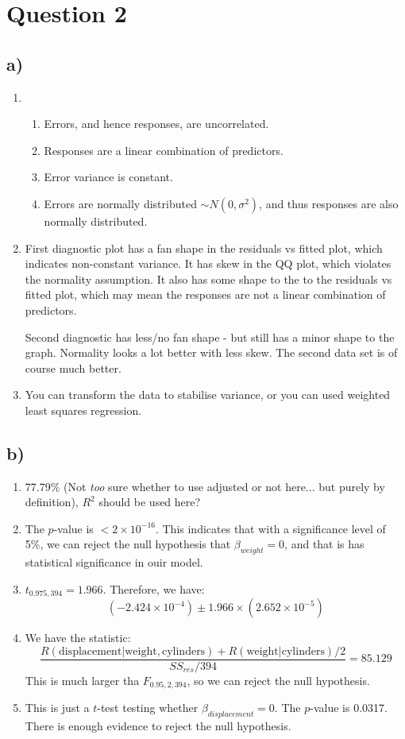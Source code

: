 \documentclass{article}
\begin{document}
\newpage 
\section*{Question 2}
\subsection*{a)}
\begin{enumerate}
    \item \begin{enumerate}
        \item Errors, and hence responses, are uncorrelated.
        \item Responses are a linear combination of predictors.
        \item Error variance is constant.
        \item Errors are normally distributed $\sim N(0, \sigma^2)$, and thus responses are also
        normally distributed.
    \end{enumerate}
    \item First diagnostic plot has a fan shape in the residuals vs fitted plot, which indicates 
    non-constant variance. It has skew in the QQ plot, which violates the normality assumption.
    It also has some shape to the to the residuals vs fitted plot, which may mean the responses 
    are not a linear combination of predictors.

    Second diagnostic has less/no fan shape - but still has a minor shape to the graph. Normality 
    looks a lot better with less skew. The second data set is of course much better.

    \item You can transform the data to stabilise variance, or you can used weighted least squares 
    regression.
\end{enumerate}

\subsection*{b)}
\begin{enumerate}
    \item 77.79\% (Not \textit{too} sure whether to use adjusted or not here... but purely by definition),
    $R^2$ should be used here?
    \item The $p$-value is $< 2\times 10^{-16}$. This indicates that with a significance level of 5\%, we can 
    reject the null hypothesis that $\beta_{weight} = 0$, and that is has statistical significance 
    in ouir model. 
    \item $t_{0.975, 394} = 1.966$. Therefore, we have:
    $$ (-2.424 \times 10^{-4}) \pm 1.966 \times (2.652 \times 10^{-5})$$
    \item We have the statistic:
    $$ \frac{R(\text{displacement}|\text{weight}, \text{cylinders}) + R(\text{weight} | \text{cylinders}) / 2}{SS_{res} / 394} = 85.129$$
    This is much larger tha $F_{0.95, 2, 394}$, so we can reject the null hypothesis. 
    \item This is just a $t$-test testing whether $\beta_{displacement} = 0$. The $p$-value is 0.0317.
    There is enough evidence to reject the null hypothesis. 
\end{enumerate}
\end{document}
